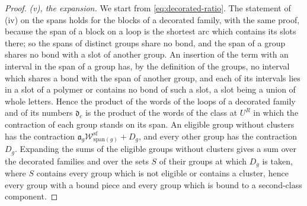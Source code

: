 \documentclass[11pt]{preprint}
\numberwithin{equation}{section}
\theoremstyle{definition}
\theoremstyle{remark}
\theoremstyle{plain}
\begin{document}
\begin{proof}
\emph{(v), the expansion.} We start from \eqref{eq:decorated-ratio}. The statement of (iv) on the spans holds for the blocks of a decorated family, with the same proof, because the span of a block on a loop is the shortest arc which contains its slots there; so the spans of distinct groups share no bond, and the span of a group shares no bond with a slot of another group. An insertion of the term with an interval in the span of a group has, by the definition of the groups, no interval which shares a bond with the span of another group, and each of its intervals lies in a slot of a polymer or contains no bond of such a slot, a slot being a union of whole letters. Hence the product of the words of the loops of a decorated family and of its numbers $\mathfrak d_c$ is the product of the words of the class at $U^R$ in which the contraction of each group stands on its span. An eligible group without clusters has the contraction $\mathfrak a_g\mathcal W^{\mathrm{sf}}_{\mathrm{span}(g)} + D_g$, and every other group has the contraction $D_g$. Expanding the sums of the eligible groups without clusters gives a sum over the decorated families and over the sets $S$ of their groups at which $D_g$ is taken, where $S$ contains every group which is not eligible or contains a cluster, hence every group with a bound piece and every group which is bound to a second-class component.


\end{proof}
\end{document}

